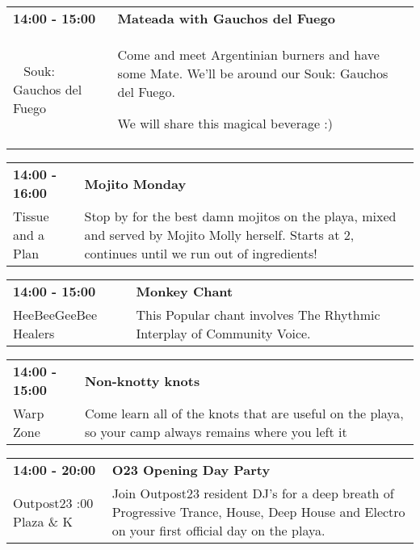 \begin{tabular}{ p{1in} p{2.2in} }
    \textbf{14:00 - 15:00} & \textbf{Mateada with Gauchos del Fuego} \\
    ~ \newline Souk: Gauchos del Fuego & Come and meet Argentinian burners and have some Mate. We'll be around our Souk: Gauchos del Fuego.

We will share this magical beverage :) \\
    \hline 
\end{tabular}
    
\begin{tabular}{ p{1in} p{2.2in} }
    \textbf{14:00 - 16:00} & \textbf{Mojito Monday} \\
    Tissue and a Plan \newline  & Stop by for the best damn mojitos on the playa, mixed and served by Mojito Molly herself. Starts at 2, continues until we run out of ingredients! \\
    \hline 
\end{tabular}
    
\begin{tabular}{ p{1in} p{2.2in} }
    \textbf{14:00 - 15:00} & \textbf{Monkey  Chant} \\
    HeeBeeGeeBee Healers \newline  & This Popular chant involves The Rhythmic Interplay of Community Voice. \\
    \hline 
\end{tabular}
    
\begin{tabular}{ p{1in} p{2.2in} }
    \textbf{14:00 - 15:00} & \textbf{Non-knotty knots} \\
    Warp Zone \newline  & Come learn all of the knots that are useful on the playa, so your camp always remains where you left it \\
    \hline 
\end{tabular}
    
\begin{tabular}{ p{1in} p{2.2in} }
    \textbf{14:00 - 20:00} & \textbf{O23 Opening Day Party} \\
    Outpost23 \newline 6:00 Plaza \& K & Join Outpost23 resident DJ's for a deep breath of Progressive Trance, House, Deep House and Electro on your first official day on the playa. \\
    \hline 
\end{tabular}
    
